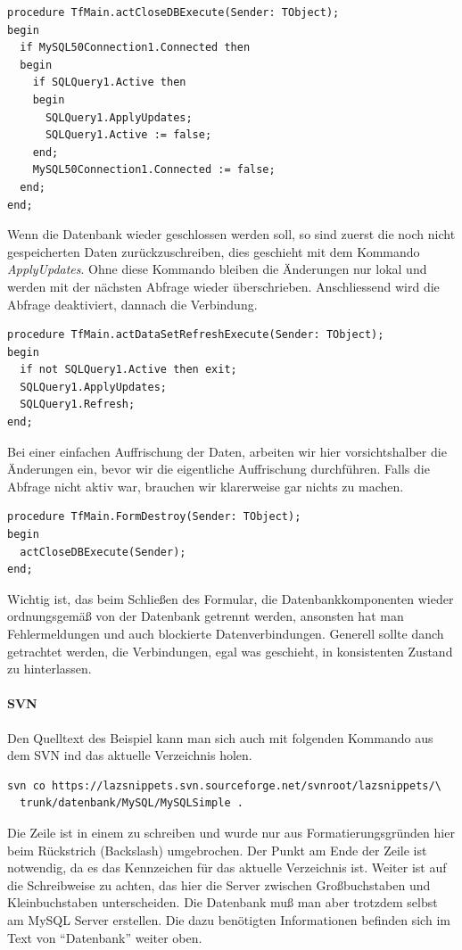 \begin{verbatim}
procedure TfMain.actCloseDBExecute(Sender: TObject);
begin
  if MySQL50Connection1.Connected then
  begin
    if SQLQuery1.Active then
    begin
      SQLQuery1.ApplyUpdates;
      SQLQuery1.Active := false;
    end;
    MySQL50Connection1.Connected := false;
  end;
end;
\end{verbatim}
Wenn die Datenbank wieder geschlossen werden soll, so sind zuerst die noch nicht gespeicherten Daten zurückzuschreiben, dies geschieht mit dem Kommando \emph{ApplyUpdates}. Ohne diese Kommando bleiben die Änderungen nur lokal und werden mit der nächsten Abfrage wieder überschrieben. Anschliessend wird die Abfrage deaktiviert, dannach die Verbindung.

\begin{verbatim}
procedure TfMain.actDataSetRefreshExecute(Sender: TObject);
begin
  if not SQLQuery1.Active then exit;
  SQLQuery1.ApplyUpdates;
  SQLQuery1.Refresh;
end;
\end{verbatim}
Bei einer einfachen Auffrischung der Daten, arbeiten wir hier vorsichtshalber die Änderungen ein, bevor wir die eigentliche Auffrischung durchführen. Falls die Abfrage nicht aktiv war, brauchen wir klarerweise gar nichts zu machen.

\begin{verbatim}
procedure TfMain.FormDestroy(Sender: TObject);
begin
  actCloseDBExecute(Sender);
end;
\end{verbatim}
Wichtig ist, das beim Schließen des Formular, die Datenbankkomponenten wieder ordnungsgemäß von der Datenbank getrennt werden, ansonsten hat man Fehlermeldungen und auch blockierte Datenverbindungen. Generell sollte danch getrachtet werden, die Verbindungen, egal was geschieht, in konsistenten Zustand zu hinterlassen.

\paragraph{SVN}
Den Quelltext des Beispiel kann man sich auch mit folgenden Kommando aus dem SVN ind das aktuelle Verzeichnis holen.
\begin{verbatim}
svn co https://lazsnippets.svn.sourceforge.net/svnroot/lazsnippets/\
  trunk/datenbank/MySQL/MySQLSimple .
\end{verbatim}
Die Zeile ist in einem zu schreiben und wurde nur aus Formatierungsgründen hier beim Rückstrich (Backslash) umgebrochen. Der Punkt am Ende der Zeile ist notwendig, da es das Kennzeichen für das aktuelle Verzeichnis ist. Weiter ist auf die Schreibweise zu achten, das hier die Server zwischen Großbuchstaben und Kleinbuchstaben unterscheiden.
Die Datenbank muß man aber trotzdem selbst am MySQL Server erstellen. Die dazu benötigten Informationen befinden sich im Text von "`Datenbank"' weiter oben.

